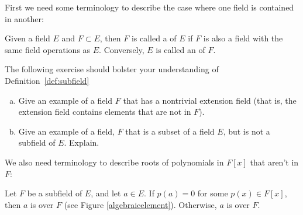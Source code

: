 First we need some  terminology to describe the case where one field is contained in  another:


\begin{defn}\label{def:subfield}  
Given a field $E$ and $F\subset E$, then $F$ is called a  of $E$ if $F$ is also a field with the same field operations as $E$. Conversely, $E$ is called an  of $F$.
 \end{defn}

The following exercise should  bolster your understanding of Definition~\ref{def:subfield}

\begin{exercise}{}
\begin{enumerate}[(a)]
\item
Give an example of a field $F$ that has a nontrivial extension field (that is, the extension field contains elements that are not in $F$).
\item
Give an example of a field, $F$ that is a subset of a field $E$, but is not a subfield of $E$. Explain.
\end{enumerate}
\end{exercise}


We also need terminology to describe roots of polynomials in $F[x]$ that aren't in $F$:

\begin{defn}\label{def:algover}  
Let $F$ be a subfield of $E$, and let $a\in E$. If $p(a)=0$ for some $p(x) \in F[x]$, then $a$ is  over $F$ (see Figure \ref{algebraicelement}). Otherwise, $a$  is  over $F$.
\end{defn}

